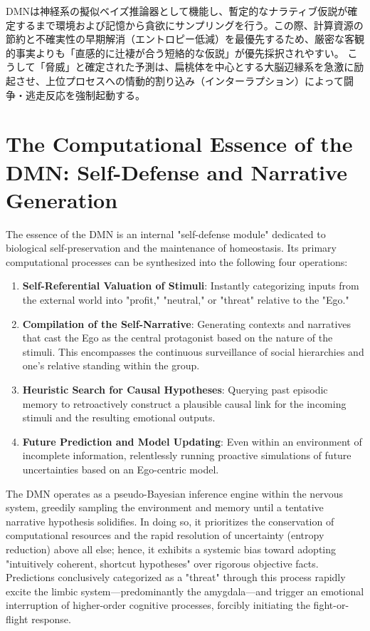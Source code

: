     DMNは神経系の擬似ベイズ推論器として機能し、暫定的なナラティブ仮説が確定するまで環境および記憶から貪欲にサンプリングを行う。この際、計算資源の節約と不確実性の早期解消（エントロピー低減）を最優先するため、厳密な客観的事実よりも「直感的に辻褄が合う短絡的な仮説」が優先採択されやすい。
    こうして「脅威」と確定された予測は、扁桃体を中心とする大脳辺縁系を急激に励起させ、上位プロセスへの情動的割り込み（インターラプション）によって闘争・逃走反応を強制起動する。
\else
    \section{The Computational Essence of the DMN: Self-Defense and Narrative Generation}
    \label{section:DMN_functions}

    The essence of the DMN is an internal "self-defense module" dedicated to biological self-preservation and the maintenance of homeostasis. Its primary computational processes can be synthesized into the following four operations:

    \begin{enumerate}[label=(\arabic*)]
        \item \textbf{Self-Referential Valuation of Stimuli}: Instantly categorizing inputs from the external world into "profit," "neutral," or "threat" relative to the "Ego."
        \item \textbf{Compilation of the Self-Narrative}: Generating contexts and narratives that cast the Ego as the central protagonist based on the nature of the stimuli. This encompasses the continuous surveillance of social hierarchies and one's relative standing within the group.
        \item \textbf{Heuristic Search for Causal Hypotheses}: Querying past episodic memory to retroactively construct a plausible causal link for the incoming stimuli and the resulting emotional outputs.
        \item \textbf{Future Prediction and Model Updating}: Even within an environment of incomplete information, relentlessly running proactive simulations of future uncertainties based on an Ego-centric model.
    \end{enumerate}

    The DMN operates as a pseudo-Bayesian inference engine within the nervous system, greedily sampling the environment and memory until a tentative narrative hypothesis solidifies. In doing so, it prioritizes the conservation of computational resources and the rapid resolution of uncertainty (entropy reduction) above all else; hence, it exhibits a systemic bias toward adopting "intuitively coherent, shortcut hypotheses" over rigorous objective facts.
    Predictions conclusively categorized as a "threat" through this process rapidly excite the limbic system—predominantly the amygdala—and trigger an emotional interruption of higher-order cognitive processes, forcibly initiating the fight-or-flight response.
\fi

